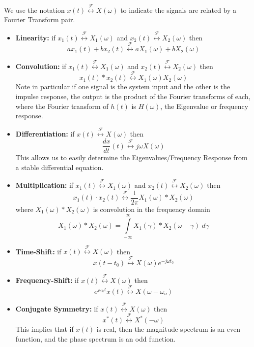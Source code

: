 We use the notation $x(t) \stackrel{\mathcal{F}}{\longleftrightarrow} X(\omega)$ to indicate the signals are related by a Fourier Transform pair.
\begin{itemize}
\item \textbf{Linearity:} if $x_1(t) \stackrel{\mathcal{F}}{\longleftrightarrow} X_1(\omega)$ and $x_2(t) \stackrel{\mathcal{F}}{\longleftrightarrow} X_2(\omega)$ then
  \[
  ax_1(t) + bx_2(t) \stackrel{\mathcal{F}}{\longleftrightarrow} aX_1(\omega) + bX_2(\omega)
  \]
\item \textbf{Convolution:} if $x_1(t) \stackrel{\mathcal{F}}{\longleftrightarrow} X_1(\omega)$ and $x_2(t) \stackrel{\mathcal{F}}{\longleftrightarrow} X_2(\omega)$ then
  \[
  x_1(t) * x_2(t) \stackrel{\mathcal{F}}{\longleftrightarrow} X_1(\omega)X_2(\omega)
  \]
  Note in particular if one signal is the system input and the other is the impulse response, the output is the product of the Fourier transforms of each, where the Fourier transform of $h(t)$ is $H(\omega)$, the Eigenvalue or frequency response.
\item \textbf{Differentiation:} if $x(t) \stackrel{\mathcal{F}}{\longleftrightarrow} X(\omega)$ then
  \[
  \frac{dx}{dt}(t) \stackrel{\mathcal{F}}{\longleftrightarrow} j\omega X(\omega)
  \]
  This allows us to easily determine the Eigenvalues/Frequency Response from a stable differential equation.
\item \textbf{Multiplication:} if $x_1(t) \stackrel{\mathcal{F}}{\longleftrightarrow} X_1(\omega)$ and $x_2(t) \stackrel{\mathcal{F}}{\longleftrightarrow} X_2(\omega)$ then
  \[
  x_1(t) \cdot x_2(t) \stackrel{\mathcal{F}}{\longleftrightarrow} \frac{1}{2\pi} X_1(\omega)*X_2(\omega)
  \]
  where $X_1(\omega)*X_2(\omega)$ is convolution in the frequency domain
  \[
  X_1(\omega)*X_2(\omega) = \int\limits_{-\infty}^{\infty} X_1(\gamma)*X_2(\omega-\gamma)\;d\gamma 
  \]
\item \textbf{Time-Shift:} if $x(t) \stackrel{\mathcal{F}}{\longleftrightarrow} X(\omega)$ then
  \[
  x(t-t_0) \stackrel{\mathcal{F}}{\longleftrightarrow} X(\omega)e^{-j\omega t_0}
  \]
\item \textbf{Frequency-Shift:} if $x(t) \stackrel{\mathcal{F}}{\longleftrightarrow} X(\omega)$ then
  \[
  e^{j\omega_0 t}x(t) \stackrel{\mathcal{F}}{\longleftrightarrow} X(\omega-\omega_o)
  \]
\item \textbf{Conjugate Symmetry:} if $x(t) \stackrel{\mathcal{F}}{\longleftrightarrow} X(\omega)$ then
  \[
  x^*(t) \stackrel{\mathcal{F}}{\longleftrightarrow} X^*(-\omega)
  \]
  This implies that if $x(t)$ is real, then the magnitude spectrum is an even function, and the phase spectrum is an odd function.


\end{itemize}

